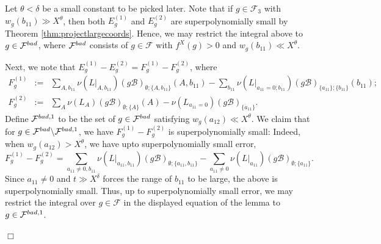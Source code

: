 \documentclass[10pt,a4paper]{amsart}
\def\FF{{\mathcal F}}
\def\bad{{\rm bad}}
\def\cB{{\mathcal B}}
\newenvironment{proof}{\noindent {\bf Proof:}}{$\Box$ \vspace{2 ex}}
\begin{document}
\begin{proof}
  Let $\theta<\delta$ be a small constant to be picked later. Note that if $g\in\FF_3$ with $w_g(b_{11})\gg X^\theta$, then both $E_g^{(1)}$ and $E_g^{(2)}$ are superpolynomially small by Theorem \ref{thm:projectlargecoords}. Hence, we may restrict the integral above to $g\in\FF^\bad$, where $\FF^\bad$ consists of $g\in\FF$ with $f^X(g)>0$ and $w_g(b_{11})\ll X^\theta$.


Next, we note that $E_g^{(1)}-E_g^{(2)}=F_g^{(1)}-F_g^{(2)}$, where 
\begin{equation*}
\begin{array}{rcl}
F^{(1)}_g&:=&\displaystyle\sum_{A,b_{11}}\nu(L|_{A,b_{11}})(g\cB)_{\emptyset;\{A,b_{11}\}}(A,b_{11})-\sum_{b_{11}}\nu(L|_{a_{11}=0;b_{11}})(g\cB)_{\{a_{11}\};\{b_{11}\}}(b_{11});
\\[.15in]
F^{(2)}_g&:=&\displaystyle\sum_{A}\nu(L_{A})(g\cB)_{\emptyset;\{A\}}(A)-\nu(L_{a_{11}=0})(g\cB)_{\{a_{11}\}}.
\end{array}
\end{equation*}
Define $\FF^{\bad,1}$ to be the set of $g\in\FF^{\bad}$ satisfying $w_g(a_{12})\ll X^\theta$. We claim that for $g\in\FF^\bad\backslash\FF^{\bad,1}$, we have $F_g^{(1)}-F_g^{(2)}$ is superpolynomially small: 
Indeed, when $w_g(a_{12})>X^\theta$, we have upto superpolynomially small error,
\begin{equation*}
F_g^{(1)}-F_g^{(2)}=\sum_{a_{11}\neq 0,b_{11}}
\nu(L|_{a_{11},b_{11}})(g\cB)_{\emptyset;\{a_{11},b_{11}\}}
-\sum_{a_{11}\neq 0}
\nu(L|_{a_{11}})(g\cB)_{\emptyset;\{a_{11}\}}.
\end{equation*}
Since $a_{11}\neq 0$ and $t\gg X^\delta$ forces the range of $b_{11}$ to be large, the above is superpolynomially small.
Thus, up to superpolynomially small error, we may restrict the integral over $g\in\FF$ in the displayed equation of the lemma to $g\in\FF^{\bad,1}$. 



\end{proof}
\end{document}
